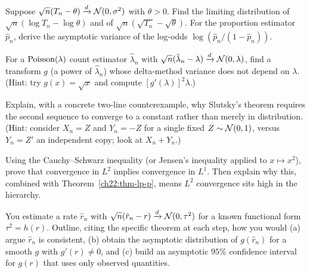 \begin{exercise}
\label{ch22:exr-delta}
Suppose $\sqrt n(T_n-\theta)\xrightarrow{d}\mathcal{N}(0,\sigma^2)$ with $\theta>0$. Find the
limiting distribution of $\sqrt n(\log T_n - \log\theta)$ and of
$\sqrt n(\sqrt{T_n}-\sqrt\theta)$. For the proportion estimator $\hat p_n$, derive the
asymptotic variance of the log-odds $\log(\hat p_n/(1-\hat p_n))$.
\end{exercise}

\begin{exercise}
\label{ch22:exr-varstab}
For a $\operatorname{Poisson}(\lambda)$ count estimator $\hat\lambda_n$ with
$\sqrt n(\hat\lambda_n-\lambda)\xrightarrow{d}\mathcal{N}(0,\lambda)$, find a transform $g$ (a power
of $\hat\lambda_n$) whose delta-method variance does not depend on $\lambda$. (Hint:
try $g(x)=\sqrt x$ and compute $[g'(\lambda)]^2\lambda$.)
\end{exercise}

\begin{exercise}
\label{ch22:exr-const}
Explain, with a concrete two-line counterexample, why Slutsky's theorem requires the
second sequence to converge to a constant rather than merely in distribution. (Hint:
consider $X_n=Z$ and $Y_n=-Z$ for a single fixed $Z\sim\mathcal{N}(0,1)$, versus
$Y_n=Z'$ an independent copy; look at $X_n+Y_n$.)
\end{exercise}

\begin{exercise}
\label{ch22:exr-l2-l1}
Using the Cauchy--Schwarz inequality (or Jensen's inequality applied to $x\mapsto
x^2$), prove that convergence in $L^2$ implies convergence in $L^1$. Then explain why
this, combined with Theorem~\ref{ch22:thm-lp-p}, means $L^2$ convergence sits high in
the hierarchy.
\end{exercise}

\begin{exercise}
\label{ch22:exr-synthesis}
You estimate a rate $\hat r_n$ with $\sqrt n(\hat r_n - r)\xrightarrow{d}\mathcal{N}(0,\tau^2)$ for a
known functional form $\tau^2=h(r)$. Outline, citing the specific theorem at each step,
how you would (a) argue $\hat r_n$ is consistent, (b) obtain the asymptotic
distribution of $g(\hat r_n)$ for a smooth $g$ with $g'(r)\ne0$, and (c) build an
asymptotic $95\%$ confidence interval for $g(r)$ that uses only observed quantities.
\end{exercise}
